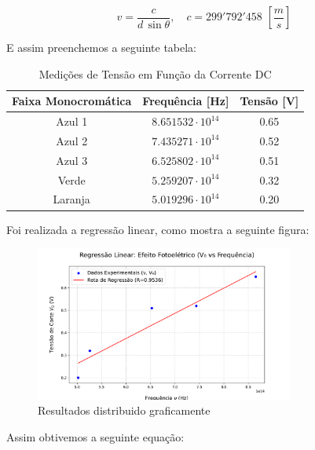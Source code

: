 \documentclass[10pt,twocolumn,letterpaper]{article}
\begin{document}
\vspace{-.25cm}

\begin{equation*}
    v = \frac{c}{d\,\sin{\theta}}, \quad c = 299'792'458 \,\, \left[\frac{m}{s}\right]
\end{equation*}

\noindent E assim preenchemos a seguinte tabela:

\begin{table}[htbp]
    \centering
    \caption{Medições de Tensão em Função da Corrente DC}
    \label{tab:medicoes_tensao}
    \vspace{0.25cm}
    \begin{tabular}{ccc}
        \hline
        \rule{0pt}{3ex}\textbf{Faixa Monocromática} & \textbf{Frequência} [Hz] & \textbf{Tensão} [V]\\[5pt]
        \hline
        \rule{0pt}{3ex}Azul 1 & $8.651532\cdot 10^{14}$ & 0.65 \\
        Azul 2 & $7.435271\cdot 10^{14}$ & 0.52 \\
        Azul 3 & $6.525802\cdot 10^{14}$ & 0.51 \\
        Verde & $5.259207\cdot 10^{14}$ & 0.32 \\
        Laranja & $5.019296\cdot 10^{14}$ & 0.20 \\[5pt]
        \hline
    \end{tabular}
\end{table}

\hspace{1cm}  Foi realizada a regressão linear, como mostra a seguinte figura:

\begin{figure}[h]
    \centering
    \includegraphics[width=8.5cm]{efeito_fotoeletrico_regressao.pdf}
    \caption{Resultados distribuido graficamente}
    \label{fig:label}
\end{figure}

\noindent Assim obtivemos a seguinte equação:
\end{document}
